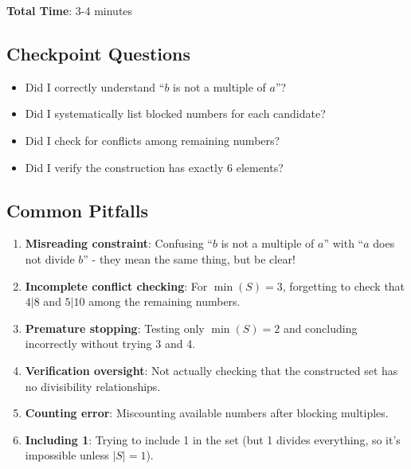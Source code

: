 \documentclass[12pt]{article}
\begin{document}
\begin{roadmapbox}
\textbf{Total Time}: 3-4 minutes

\subsection*{Checkpoint Questions}
\begin{itemize}
    \item Did I correctly understand ``$b$ is not a multiple of $a$''?
    \item Did I systematically list blocked numbers for each candidate?
    \item Did I check for conflicts among remaining numbers?
    \item Did I verify the construction has exactly 6 elements?
\end{itemize}

\subsection*{Common Pitfalls}
\begin{enumerate}
    \item \textbf{Misreading constraint}: Confusing ``$b$ is not a multiple of $a$'' with ``$a$ does not divide $b$'' - they mean the same thing, but be clear!
    
    \item \textbf{Incomplete conflict checking}: For $\min(S) = 3$, forgetting to check that $4|8$ and $5|10$ among the remaining numbers.
    
    \item \textbf{Premature stopping}: Testing only $\min(S) = 2$ and concluding incorrectly without trying 3 and 4.
    
    \item \textbf{Verification oversight}: Not actually checking that the constructed set has no divisibility relationships.
    
    \item \textbf{Counting error}: Miscounting available numbers after blocking multiples.
    
    \item \textbf{Including 1}: Trying to include 1 in the set (but 1 divides everything, so it's impossible unless $|S|=1$).
\end{enumerate}
\end{roadmapbox}
\end{document}
